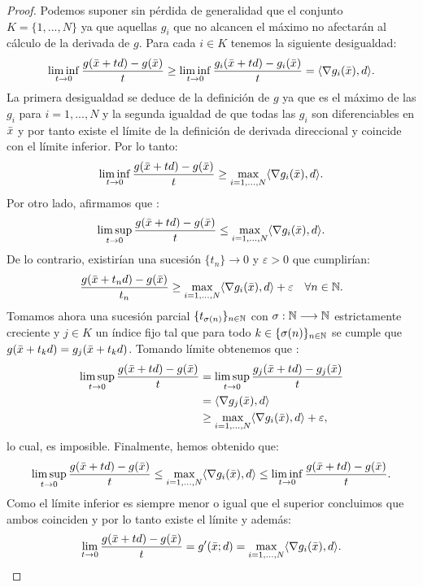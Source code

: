 	\begin{proof}
		Podemos suponer sin pérdida de generalidad que el conjunto $ K = \{1, ..., N \} $ ya que aquellas $ g_i $ que no alcancen el máximo no afectarán al cálculo de la derivada de $ g $. Para cada $ i \in K $ tenemos la siguiente desigualdad:
		\begin{equation*}
			\liminf_{t\rightarrow0}\frac{g(\bar{x}+td) - g(\bar{x})}{t} \geq \liminf_{t\rightarrow0}\frac{g_i(\bar{x}+td) - g_i(\bar{x})}{t} = \langle \nabla g_i(\bar{x}), d \rangle.
		\end{equation*}	
		La primera desigualdad se deduce de la definición de $ g $ ya que es el máximo de las $ g_i $ para $ i=1,...,N$ y la segunda igualdad de que todas las $ g_i $ son diferenciables en $ \bar{x} $ y por tanto existe el límite de la definición de derivada direccional y coincide con el límite inferior. Por lo tanto:
		\[
		\liminf_{t\rightarrow0}\frac{g(\bar{x}+td) - g(\bar{x})}{t} \geq \max_{i=1,...,N}\langle \nabla g_i(\bar{x}), d \rangle.
		\]
		Por otro lado, afirmamos que :
		\begin{equation*}
			\limsup_{t\rightarrow0}\frac{g(\bar{x}+td) - g(\bar{x})}{t} \leq \max_{i=1,...,N}\langle \nabla g_i(\bar{x}), d \rangle.
		\end{equation*}
		De lo contrario, existirían una sucesión $ \{t_n\}\rightarrow 0 $ y $ \varepsilon > 0 $ que cumplirían:
		\[
		\frac{g(\bar{x}+t_n d) - g(\bar{x})}{t_n} \geq \max_{i=1,...,N}\langle \nabla g_i(\bar{x}), d \rangle + \varepsilon \quad \forall n \in \mathbb{N}.
		\]
		Tomamos ahora una sucesión parcial $ \{t_{\sigma(n)}\}_{n \in \mathbb{N}} $ con $ \sigma:\mathbb{N} \longrightarrow \mathbb{N} $ estrictamente creciente y $ j \in K $ un índice fijo tal que para todo $ k \in \{\sigma(n)\}_{n \in \mathbb{N}} $ se cumple que $ g(\bar{x} + t_k d) = g_j (\bar{x} + t_k d)$. Tomando límite obtenemos que :
		\begin{equation*}
		\begin{split}
		\limsup_{t\rightarrow0}\frac{g(\bar{x}+td) - g(\bar{x})}{t} &= 	\limsup_{t\rightarrow0}\frac{g_j(\bar{x}+td) - g_j(\bar{x})}{t} \\
		&= \langle \nabla g_j(\bar{x}), d \rangle \\ &\geq \max_{i=1,...,N}\langle \nabla g_i(\bar{x}), d \rangle + \varepsilon,
		\end{split}
		\end{equation*}
		lo cual, es imposible. Finalmente, hemos obtenido que:
		\[
		\limsup_{t\rightarrow0}\frac{g(\bar{x}+td) - g(\bar{x})}{t} \leq \max_{i=1,...,N}\langle \nabla g_i(\bar{x}), d \rangle \leq 	\liminf_{t\rightarrow0}\frac{g(\bar{x}+td) - g(\bar{x})}{t}.
		\]
		Como el límite inferior es siempre menor o igual que el superior concluimos que ambos coinciden y por lo tanto existe el límite y además:
		\[
		\lim_{t\rightarrow0}\frac{g(\bar{x}+td) - g(\bar{x})}{t} = g'(\bar{x};d) = \max_{i=1,...,N}\langle \nabla g_i(\bar{x}), d \rangle.
		\]
	\end{proof}

